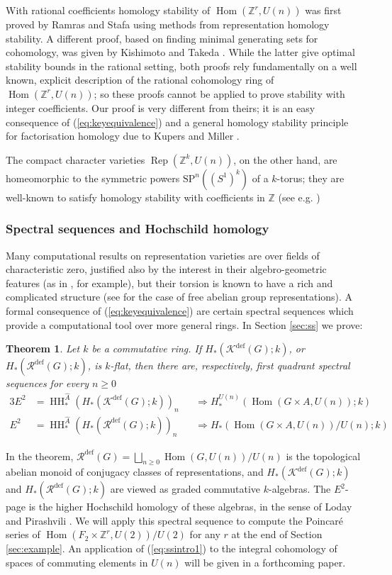 \documentclass[oneside, a4paper, 12pt]{article}
\numberwithin{equation}{section}
\DeclareMathOperator{\Rep}{Rep}
\DeclareMathOperator{\Hom}{Hom}
\DeclareMathOperator{\HH}{HH}
\newcommand{\Kdef}{\mathcal{K}^{\mathrm{def}}}
\newcommand{\Rdef}{\mathcal{R}^{\mathrm{def}}}
\newcommand{\Z}{\mathbb{Z}}
\theoremstyle{plain}
\newtheorem{theorem}{Theorem}[section]
\theoremstyle{definition}
\theoremstyle{remark}
\begin{document}
With rational coefficients homology stability of $\Hom(\Z^r,U(n))$ was first proved by Ramras and Stafa \cite{RS20} using methods from representation homology stability. A different proof, based on finding minimal generating sets for cohomology, was given by Kishimoto and Takeda \cite{KT21}. While the latter give optimal stability bounds in the rational setting, both proofs rely fundamentally on a well known, explicit description of the rational cohomology ring of $\Hom(\Z^r,U(n))$; so these proofs cannot be applied to prove stability with integer coefficients. Our proof is very different from theirs; it is an easy consequence of (\ref{eq:keyequivalence}) and a general homology stability principle for factorisation homology due to Kupers and Miller \cite{KM18}.

The compact character varieties $\Rep(\Z^k,U(n))$, on the other hand, are homeomorphic to the symmetric powers $\mathrm{SP}^n((S^1)^k)$ of a $k$-torus; they are well-known to satisfy homology stability with coefficients in $\Z$ (see e.g. \cite[Example 1.4]{KM18})


\subsubsection*{Spectral sequences and Hochschild homology}

Many computational results on representation varieties are over fields of characteristic zero, justified also by the interest in their algebro-geometric features (as in \cite{FLS}, for example), but their torsion is known to have a rich and complicated structure (see \cite{KT24} for the case of free abelian group representations). A formal consequence of (\ref{eq:keyequivalence}) are certain spectral sequences which provide a computational tool over more general rings. In Section \ref{sec:ss} we prove:


\begin{theorem} \label{thm:ssintro}
Let $k$ be a commutative ring. If $H_\ast(\Kdef(G);k)$, or $H_\ast(\Rdef(G);k)$, is $k$-flat, then there are, respectively, first quadrant spectral sequences for every $n\geq 0$
\begin{alignat}{3}
E^2 & =\HH^{\widehat{A}}_\ast(H_\ast(\Kdef(G);k))_n  && \Longrightarrow H_\ast^{U(n)}(\Hom(G\times A,U(n));k) \label{eq:ssintro1}\\ 
E^2 & =\HH^{\widehat{A}}_\ast(H_\ast(\Rdef(G);k))_n  && \Longrightarrow H_\ast(\Hom(G\times A,U(n))/U(n);k) \label{eq:ssintro2}
\end{alignat}
\end{theorem}
In the theorem, $\Rdef(G)=\bigsqcup_{n\geq 0} \Hom(G,U(n))/U(n)$ is the topological abelian monoid of conjugacy classes of representations, and $H_\ast(\Kdef(G);k)$ and $H_\ast(\Rdef(G);k)$ are viewed as graded commutative $k$-algebras. The $E^2$-page is the higher Hochschild homology of these algebras, in the sense of Loday and Pirashvili \cite{Pirashvili}. We will apply this spectral sequence to compute the Poincar{\'e} series of $\Hom(F_2\times \Z^r,U(2))/U(2)$ for any $r$ at the end of Section \ref{sec:example}. An application of (\ref{eq:ssintro1}) to the integral cohomology of spaces of commuting elements in $U(n)$ will be given in a forthcoming paper.
\end{document}
